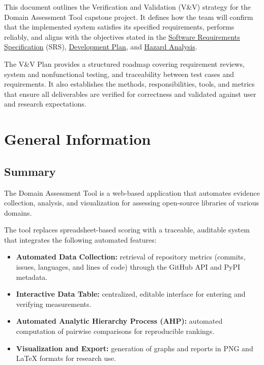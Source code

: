 \documentclass[12pt, titlepage]{article}
\begin{document}
This document outlines the Verification and Validation (V\&V) strategy for the
Domain Assessment Tool capstone project. It defines how
the team will confirm that the implemented system satisfies its specified
requirements, performs reliably, and aligns with the objectives stated in the
\href{https://github.com/thaafei/DomainX/blob/main/docs/SRS/SRS.pdf}{Software Requirements Specification} (SRS), \href{https://github.com/thaafei/DomainX/blob/main/docs/DevelopmentPlan/DevelopmentPlan.pdf}{Development Plan}, and \href{https://github.com/thaafei/DomainX/blob/main/docs/HazardAnalysis/HazardAnalysis.pdf}{Hazard
Analysis}.

The V\&V Plan provides a structured roadmap covering requirement reviews,
system and nonfunctional testing, and traceability between test cases and
requirements. It also establishes the methods, responsibilities, tools, and
metrics that ensure all deliverables are verified for correctness and validated
against user and research expectations.

\section{General Information}
\label{sec:general-info}
\subsection{Summary}
\label{subsec:summary}
The Domain Assessment Tool is a web-based application
that automates evidence collection, analysis, and visualization for assessing
open-source libraries of various domains.

The tool replaces spreadsheet-based scoring with a traceable, auditable system
that integrates the following automated features:

\begin{itemize}
  \item \textbf{Automated Data Collection:} retrieval of repository metrics
  (commits, issues, languages, and lines of code) through the GitHub API and
  PyPI metadata.

  \item \textbf{Interactive Data Table:} centralized, editable interface for
  entering and verifying measurements.

  \item \textbf{Automated Analytic Hierarchy Process (AHP):} automated
  computation of pairwise comparisons for reproducible rankings.

  \item \textbf{Visualization and Export:} generation of graphs and reports in
  PNG and \LaTeX{} formats for research use.
\end{itemize}
\end{document}
